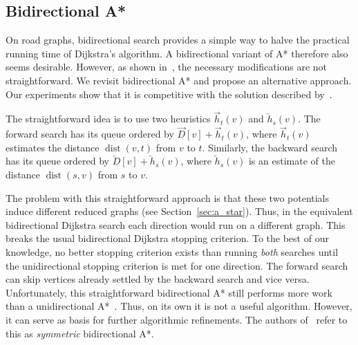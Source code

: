 \documentclass[manuscript,review]{acmart}
\newcommand*{\dist}{\operatorname{dist}}
\begin{document}
\subsection{Bidirectional A*}\label{sec:bidir_astar}

On road graphs, bidirectional search provides a simple way to halve the practical running time of Dijkstra's algorithm.
A bidirectional variant of A* therefore also seems desirable.
However, as shown in~\cite{gh-cspas-05}, the necessary modifications are not straightforward.
We revisit bidirectional A* and propose an alternative approach.
Our experiments show that it is competitive with the solution described by~\cite{gh-cspas-05}.

The straightforward idea is to use two heuristics $\overrightarrow{h}_t(v)$ and $\overleftarrow{h}_s(v)$.
The forward search has its queue ordered by $\overrightarrow{D}[v] + \overrightarrow{h}_t(v)$, where $\overrightarrow{h}_t(v)$ estimates the distance $\dist(v,t)$ from $v$ to $t$.
Similarly, the backward search has its queue ordered by $\overleftarrow{D}[v] + \overleftarrow{h}_s(v)$, where $\overleftarrow{h}_s(v)$ is an estimate of the distance $\dist(s,v)$ from $s$ to $v$.

The problem with this straightforward approach is that these two potentials induce different reduced graphs (see Section~\ref{sec:a_star}).
Thus, in the equivalent bidirectional Dijkstra search each direction would run on a different graph.
This breaks the usual bidirectional Dijkstra stopping criterion.
To the best of our knowledge, no better stopping criterion exists than running \emph{both} searches until the unidirectional stopping criterion is met for one direction.
The forward search can skip vertices already settled by the backward search and vice versa.
Unfortunately, this straightforward bidirectional A* still performs more work than a unidirectional A*~\cite{gh-cspas-05}.
Thus, on its own it is not a useful algorithm.
However, it can serve as basis for further algorithmic refinements.
The authors of~\cite{gh-cspas-05} refer to this as \emph{symmetric} bidirectional A*.
\end{document}
